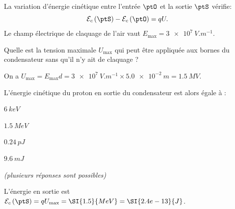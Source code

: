 La variation d'énergie cinétique entre l'entrée $\ptO$ et la sortie $\ptS$ vérifie:
\[
\text{\ensuremath{\mathcal{E}_{c}\left(\ptS\right)}}-\text{\ensuremath{\mathcal{E}_{c}\left(\ptO\right)}}=qU.
\]
\smallskip
Le champ électrique de claquage de l'air vaut $E_{\text{max}}=\SI{3e7}{V.m^{-1}}$.

\debutEntrainement


\begin{enonce}
Quelle est la tension maximale $U_{\text{max}}$ qui peut être appliquée aux bornes du condensateur sans qu'il n'y ait de claquage ?
\end{enonce}


\begin{corrige}
On a $U_{\text{max}} = E_{\text{max}}d = \SI{3e7}{V.m^{-1}} \times \SI{5.0e-2}{m}=\SI{1.5}{MV}$.
\end{corrige}




\begin{enonce}
L'énergie cinétique du proton en sortie du condensateur est alors égale à :
\begin{listeQCM4Colonnes}
\item $\SI{6}{keV}$
\item $\SI{1.5}{MeV}$
\item $\SI{0.24}{pJ}$
\item $\SI{9.6}{mJ}$ 
\end{listeQCM4Colonnes}
\bigskip

\hfill {\itshape (plusieurs réponses sont possibles)}

\end{enonce}


\begin{corrige}
L'énergie en sortie est $\text{\ensuremath{\mathcal{E}_{c}\left(\ptS\right)}}=qU_{\text{max}}=\SI{1.5}{MeV}=\SI{2.4e-13}{J}$.
\end{corrige}

